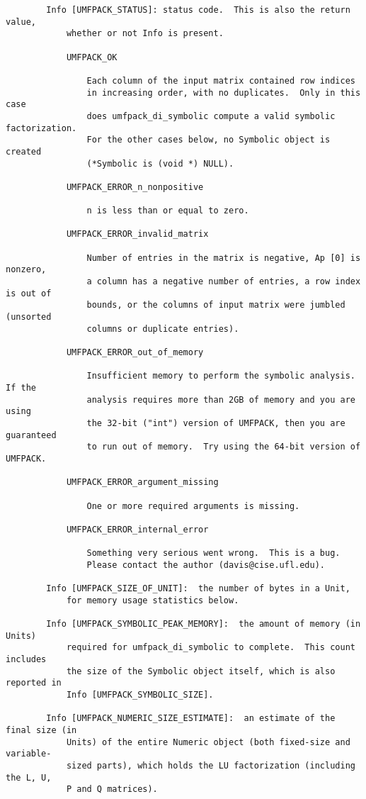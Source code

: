 \documentclass[11pt]{article}
\begin{document}
{\begin{verbatim}
        Info [UMFPACK_STATUS]: status code.  This is also the return value,
            whether or not Info is present.

            UMFPACK_OK

                Each column of the input matrix contained row indices
                in increasing order, with no duplicates.  Only in this case
                does umfpack_di_symbolic compute a valid symbolic factorization.
                For the other cases below, no Symbolic object is created
                (*Symbolic is (void *) NULL).

            UMFPACK_ERROR_n_nonpositive

                n is less than or equal to zero.

            UMFPACK_ERROR_invalid_matrix

                Number of entries in the matrix is negative, Ap [0] is nonzero,
                a column has a negative number of entries, a row index is out of
                bounds, or the columns of input matrix were jumbled (unsorted
                columns or duplicate entries).

            UMFPACK_ERROR_out_of_memory

                Insufficient memory to perform the symbolic analysis.  If the
                analysis requires more than 2GB of memory and you are using
                the 32-bit ("int") version of UMFPACK, then you are guaranteed
                to run out of memory.  Try using the 64-bit version of UMFPACK.

            UMFPACK_ERROR_argument_missing

                One or more required arguments is missing.

            UMFPACK_ERROR_internal_error

                Something very serious went wrong.  This is a bug.
                Please contact the author (davis@cise.ufl.edu).

        Info [UMFPACK_SIZE_OF_UNIT]:  the number of bytes in a Unit,
            for memory usage statistics below.

        Info [UMFPACK_SYMBOLIC_PEAK_MEMORY]:  the amount of memory (in Units)
            required for umfpack_di_symbolic to complete.  This count includes
            the size of the Symbolic object itself, which is also reported in
            Info [UMFPACK_SYMBOLIC_SIZE].

        Info [UMFPACK_NUMERIC_SIZE_ESTIMATE]:  an estimate of the final size (in
            Units) of the entire Numeric object (both fixed-size and variable-
            sized parts), which holds the LU factorization (including the L, U,
            P and Q matrices).


\end{verbatim}}
\end{document}
